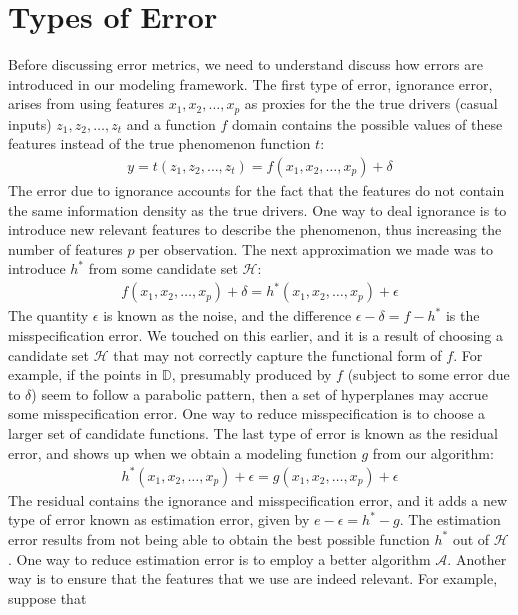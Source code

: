 \documentclass[12pt]{article}
\begin{document}
	\section{Types of Error}
	Before discussing error metrics, we need to understand discuss how errors
	are introduced in our modeling framework. The first type of error, ignorance
	error, arises from using features $x_1,x_2,\ldots,x_p$ as proxies for
	the the true drivers (casual inputs) $z_1,z_2,\ldots,z_t$ and a function
	$f$ domain contains the possible values of these features instead of
	the true phenomenon function $t$:
	\begin{align*}
		y = t(z_1,z_2,\ldots,z_t)=f(x_1,x_2,\ldots,x_p) +\delta
	\end{align*}
	The error due to ignorance accounts for the fact that the features do not
	contain the same information density as the true drivers. One way to
	deal ignorance is to introduce new relevant features to describe the
	phenomenon, thus increasing the number of features $p$ per observation.
	The next approximation we made was to introduce $h^*$ from some candidate
	set $\mathcal{H}$:
	\begin{align*}
		f(x_1,x_2,\ldots,x_p) + \delta = h^*(x_1,x_2,\ldots,x_p) + \epsilon
	\end{align*}
	The quantity $\epsilon$ is known as the noise, and the difference
	$\epsilon-\delta=f-h^*$ is the misspecification error. We touched on this
	earlier, and it is a result of choosing a candidate set $\mathcal{H}$ that
	may not correctly capture the functional form of $f$. For example, if the
	points in $\mathbb{D}$, presumably produced by $f$ (subject to some error
	due to $\delta$) seem to follow a parabolic pattern, then a set of
	hyperplanes may accrue some misspecification error. One way to reduce
	misspecification is to choose a larger set of candidate functions.
	The last type of error is known as the residual error, and shows up when we obtain a modeling function $g$ from our algorithm:
	\begin{align*}
		h^*(x_1,x_2,\ldots,x_p) + \epsilon = g(x_1,x_2,\ldots,x_p) + \epsilon
	\end{align*}
	The residual contains the ignorance and misspecification error, and it
	adds a new type of error known as estimation error, given by $e-\epsilon = h^*-g$.
	The estimation error results from not being able to obtain the best possible
	function $h^*$ out of $\mathcal{H}$. One way to reduce estimation error is to
	employ a better algorithm $\mathcal{A}$. Another way is to ensure that
	the features that we use are indeed relevant. For example, suppose that
\end{document}
